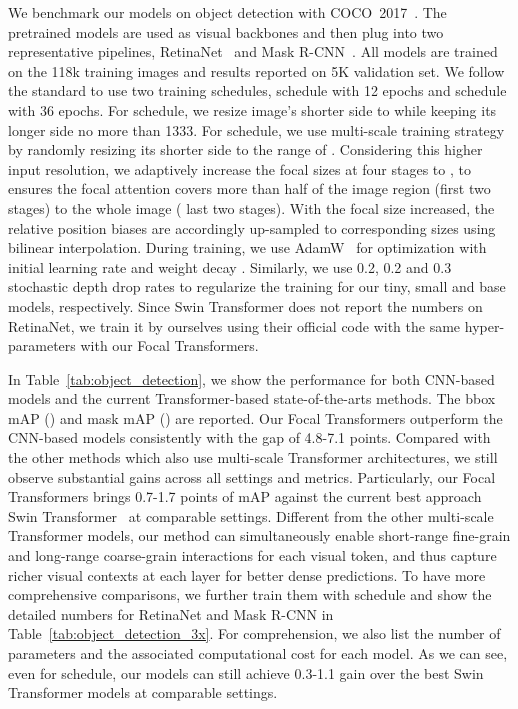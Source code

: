 \documentclass{article}
\begin{document}
We benchmark our models on object detection with COCO~2017~\cite{lin2014microsoft}. The pretrained models are used as visual backbones and then plug into two representative pipelines, RetinaNet~\cite{lin2017focal} and Mask R-CNN~\cite{he2017mask}. All models are trained on the 118k training images and results reported on 5K validation set. We follow the standard to use two training schedules,  schedule with 12 epochs and  schedule with 36 epochs. For  schedule, we resize image's shorter side to  while keeping its longer side no more than 1333. For   schedule, we use multi-scale training strategy by randomly resizing its shorter side to the range of . Considering this higher input resolution, we adaptively increase the focal sizes at four stages to , to ensures the focal attention covers more than half of the image region (first two stages) to the whole image ( last two stages). With the focal size increased, the relative position biases are accordingly up-sampled to corresponding sizes using bilinear interpolation. During training, we use AdamW~\cite{loshchilov2017decoupled} for optimization with initial learning rate  and weight decay . Similarly, we use 0.2, 0.2 and 0.3 stochastic depth drop rates to regularize the training for our tiny, small and base models, respectively. Since Swin Transformer does not report the numbers on RetinaNet, we train it by ourselves using their official code with the same hyper-parameters with our Focal Transformers. 


In Table~\ref{tab:object_detection}, we show the performance for both CNN-based models and the current Transformer-based state-of-the-arts methods. The bbox mAP () and mask mAP () are reported. Our Focal Transformers outperform the CNN-based models consistently with the gap of 4.8-7.1 points. Compared with the other methods which also use multi-scale Transformer architectures, we still observe substantial gains across all settings and metrics. Particularly, our Focal Transformers brings 0.7-1.7 points of mAP against the current best approach Swin Transformer~\cite{liu2021swin} at comparable settings. Different from the other multi-scale Transformer models, our method can simultaneously enable short-range fine-grain and long-range coarse-grain interactions for each visual token, and thus capture richer visual contexts at each layer for better dense predictions. To have more comprehensive comparisons, we further train them with    schedule and show the detailed numbers for RetinaNet and Mask R-CNN in Table~\ref{tab:object_detection_3x}. For comprehension, we also list the number of parameters and the associated computational cost for each model. As we can see, even for    schedule, our models can still achieve 0.3-1.1 gain over the best Swin Transformer models at comparable settings.
\end{document}
